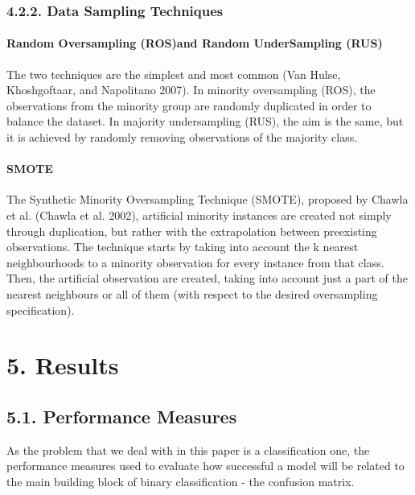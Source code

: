 \documentclass[12pt,]{article}
\let\oldparagraph\paragraph
\renewcommand{\paragraph}[1]{\oldparagraph{#1}\mbox{}}
\begin{document}
\hypertarget{data-sampling-techniques}{%
\subsubsection{4.2.2. Data Sampling
Techniques}\label{data-sampling-techniques}}

\hypertarget{random-oversampling-rosand-random-undersampling-rus}{%
\paragraph{Random Oversampling (ROS)and Random UnderSampling
(RUS)}\label{random-oversampling-rosand-random-undersampling-rus}}

The two techniques are the simplest and most common (Van Hulse,
Khoshgoftaar, and Napolitano 2007). In minority oversampling (ROS), the
observations from the minority group are randomly duplicated in order to
balance the dataset. In majority undersampling (RUS), the aim is the
same, but it is achieved by randomly removing observations of the
majority class.

\hypertarget{smote}{%
\paragraph{SMOTE}\label{smote}}

The Synthetic Minority Oversampling Technique (SMOTE), proposed by
Chawla et al. (Chawla et al. 2002), artificial minority instances are
created not simply through duplication, but rather with the
extrapolation between preexisting observations. The technique starts by
taking into account the k nearest neighbourhoods to a minority
observation for every instance from that class. Then, the artificial
observation are created, taking into account just a part of the nearest
neighbours or all of them (with respect to the desired oversampling
specification).

\hypertarget{results}{%
\section{5. Results}\label{results}}

\hypertarget{performance-measures}{%
\subsection{5.1. Performance Measures}\label{performance-measures}}

As the problem that we deal with in this paper is a classification one,
the performance measures used to evaluate how successful a model will be
related to the main building block of binary classification - the
confusion matrix.
\end{document}
